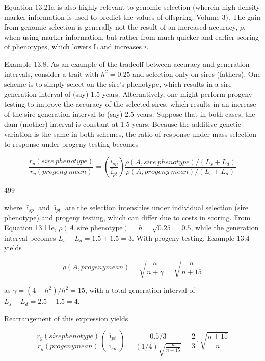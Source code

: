 \documentclass{article}
\begin{document}
Equation 13.21a is also highly relevant to genomic selection (wherein high-density marker information is used to predict the values of offspring; Volume 3). The gain from genomic selection is generally not the result of an increased accuracy,  $ \rho $, when using marker information, but rather from much quicker and earlier scoring of phenotypes, which lowers L and increases  $ \bar{i} $.

Example 13.8. As an example of the tradeoff between accuracy and generation intervals, consider a trait with  $ h^2 = 0.25 $ and selection only on sires (fathers). One scheme is to simply select on the sire's phenotype, which results in a sire generation interval of (say) 1.5 years. Alternatively, one might perform progeny testing to improve the accuracy of the selected sires, which results in an increase of the sire generation interval to (say) 2.5 years. Suppose that in both cases, the dam (mother) interval is constant at 1.5 years. Because the additive-genetic variation is the same in both schemes, the ratio of response under mass selection to response under progeny testing becomes

\begin{equation}
\frac{r_{y}(sire\ phenotype)}{r_{y}(progeny\ mean)}=\left(\frac{\overline{i}_{sp}}{\overline{i}_{pt}}\right)\frac{\rho(A,sire\ phenotype)/(L_{s}+L_{d})}{\rho(A,progeny\ mean)/(L_{s}+L_{d})}
\end{equation}

499

where  $ \bar{\imath}_{sp} $ and  $ \bar{\imath}_{pt} $ are the selection intensities under individual selection (sire phenotype) and progeny testing, which can differ due to costs in scoring. From Equation 13.11e,  $ \rho(A,\text{sire phenotype}) = h = \sqrt{0.25} = 0.5 $, while the generation interval becomes  $ L_s + L_d = 1.5 + 1.5 = 3 $. With progeny testing, Example 13.4 yields

\begin{equation}
\rho(A,progeny mean)=\sqrt{\frac{n}{n+\gamma}}=\sqrt{\frac{n}{n+15}}
\end{equation}

as  $ \gamma = (4 - h^{2})/h^{2} = 15 $, with a total generation interval of  $ L_{s} + L_{d} = 2.5 + 1.5 = 4 $.

Rearrangement of this expression yields

\begin{equation}
\frac{r_{y}(sire phenotype)}{r_{y}(progeny mean)}\left(\frac{\overline{\imath}_{pt}}{\overline{\imath}_{sp}}\right)=\frac{0.5/3}{(1/4)\sqrt{\frac{n}{n+15}}}=\frac{2}{3}\cdot\sqrt{\frac{n+15}{n}}
\end{equation}
\end{document}
